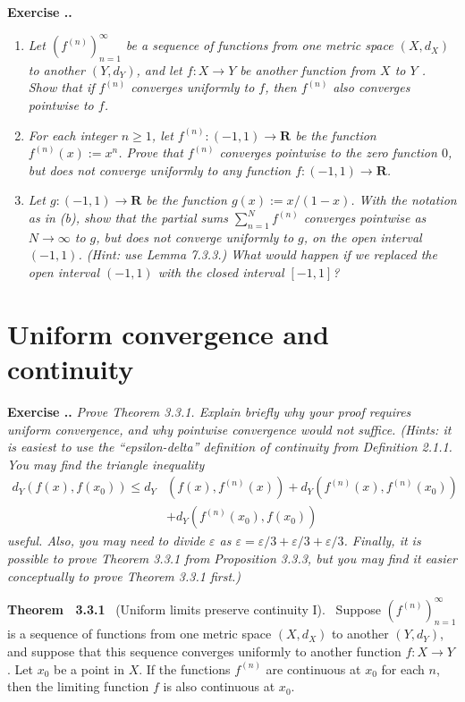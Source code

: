 \documentclass{book}
\newcommand{\titl}[1]{\noindent\textbf{#1}}
\newcounter{Exercise}[section]
\renewcommand{\theExercise}{\thesection.\arabic{Exercise}.}
\newcommand{\new}{\vspace{1.5em}\noindent\textbf{Exercise \stepcounter{Exercise}\textbf{\theExercise}} }
\begin{document}
\new
\begin{enumerate}
    \item \emph{Let $(f^{(n)})_{n=1}^{\infty}$ be a sequence of functions from one metric space $(X,d_X)$ to another $(Y,d_Y)$, and let $f:X\to Y$ be another function from $X$ to $Y$ . Show that if $f^{(n)}$ converges uniformly to $f$, then $f^{(n)}$ also converges pointwise to $f$.}
    \item \emph{For each integer $n\geq 1$, let $f^{(n)}:(-1,1)\to\mathbf{R}$ be the function $f^{(n)}(x):=x^n$. Prove that $f^{(n)}$ converges pointwise to the zero function $0$, but does not converge uniformly to any function $f:(-1,1)\to\mathbf{R}$.}
    \item \emph{Let $g:(-1,1)\to\mathbf{R}$ be the function $g(x):=x/(1-x)$. With the notation as in (b), show that the partial sums $\sum_{n=1}^{N}f^{(n)}$ converges pointwise as $N\to\infty$ to $g$, but does not converge uniformly to $g$, on the open interval $(-1,1)$. (Hint: use Lemma 7.3.3.) What would happen if we replaced the open interval $(-1,1)$ with the closed interval $[-1,1]$?}
\end{enumerate}

\section{Uniform convergence and continuity}

\new\emph{Prove Theorem 3.3.1. Explain briefly why your proof requires uniform convergence, and why pointwise convergence would not suffice. (Hints: it is easiest to use the ``epsilon-delta'' definition of continuity from Definition 2.1.1. You may find the triangle inequality}
    \begin{align*}
        d_Y(f(x),f(x_0))\leq d_Y&(f(x),f^{(n)}(x))+d_Y(f^{(n)}(x),f^{(n)}(x_0))\\
        &+d_Y(f^{(n)}(x_0),f(x_0))
    \end{align*}
\emph{useful. Also, you may need to divide $\varepsilon$ as $\varepsilon=\varepsilon/3+\varepsilon/3+\varepsilon/3$. Finally, it is possible to prove Theorem 3.3.1 from Proposition 3.3.3, but you may find it easier conceptually to prove Theorem 3.3.1 first.)}

\begin{framed}
\titl{Theorem~ 3.3.1}~ (Uniform limits preserve continuity I).~ Suppose $(f^{(n)})_{n=1}^{\infty}$ is a sequence of functions from one metric space $(X,d_X)$ to another $(Y,d_Y)$, and suppose that this sequence converges uniformly to another function $f:X\to Y$ . Let $x_0$ be a point in $X$. If the functions $f^{(n)}$ are continuous at $x_0$ for each $n$, then the limiting function $f$ is also continuous at $x_0$.
\end{framed}
\end{document}
